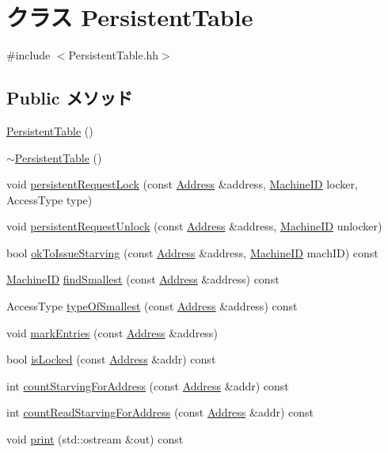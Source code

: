 \hypertarget{classPersistentTable}{
\section{クラス PersistentTable}
\label{classPersistentTable}
}


{\ttfamily \#include $<$PersistentTable.hh$>$}\subsection*{Public メソッド}
\begin{DoxyCompactItemize}
\item 
\hyperlink{classPersistentTable_a510294388f7eff2158e00342afd3e945}{PersistentTable} ()
\item 
\hyperlink{classPersistentTable_a628f212bbb694c12cbdde6854bd8c03b}{$\sim$PersistentTable} ()
\item 
void \hyperlink{classPersistentTable_a628d4613da4e9d953077a69cb0c67e43}{persistentRequestLock} (const \hyperlink{classAddress}{Address} \&address, \hyperlink{structMachineID}{MachineID} locker, AccessType type)
\item 
void \hyperlink{classPersistentTable_a9b62725c7279882365ff19efb985b035}{persistentRequestUnlock} (const \hyperlink{classAddress}{Address} \&address, \hyperlink{structMachineID}{MachineID} unlocker)
\item 
bool \hyperlink{classPersistentTable_a0de642e5242f4db892cdd20a693fc7e1}{okToIssueStarving} (const \hyperlink{classAddress}{Address} \&address, \hyperlink{structMachineID}{MachineID} machID) const 
\item 
\hyperlink{structMachineID}{MachineID} \hyperlink{classPersistentTable_a2a83d43cb75685cce8e2beb456e71375}{findSmallest} (const \hyperlink{classAddress}{Address} \&address) const 
\item 
AccessType \hyperlink{classPersistentTable_ad8b7797f65c290ccfb5963c3770a03b3}{typeOfSmallest} (const \hyperlink{classAddress}{Address} \&address) const 
\item 
void \hyperlink{classPersistentTable_ae534be554d865e61002a832e0fdc2684}{markEntries} (const \hyperlink{classAddress}{Address} \&address)
\item 
bool \hyperlink{classPersistentTable_a1fdc9104426b06c2dda1a9bef5f7ec58}{isLocked} (const \hyperlink{classAddress}{Address} \&addr) const 
\item 
int \hyperlink{classPersistentTable_ac7209c5a747491d956abe358ea30b987}{countStarvingForAddress} (const \hyperlink{classAddress}{Address} \&addr) const 
\item 
int \hyperlink{classPersistentTable_ac80b0e6c384f94d8e1c64cfe0d4fc4ad}{countReadStarvingForAddress} (const \hyperlink{classAddress}{Address} \&addr) const 
\item 
void \hyperlink{classPersistentTable_ac55fe386a101fbae38c716067c9966a0}{print} (std::ostream \&out) const 
\end{DoxyCompactItemize}
